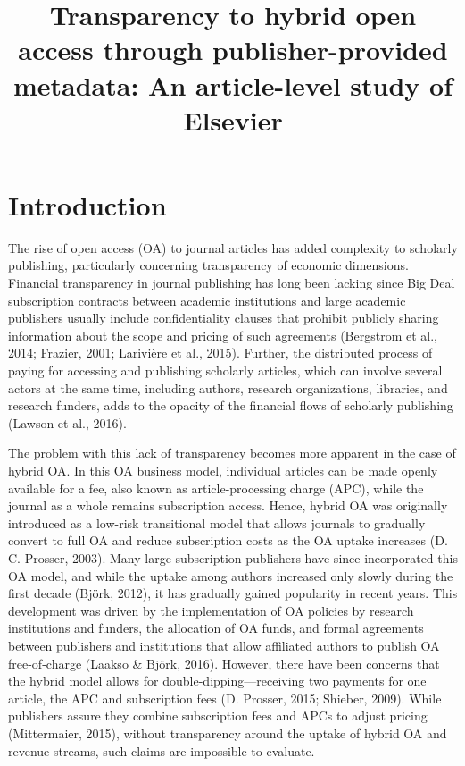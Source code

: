 \documentclass[a4paper,man,floatsintext,longtable,noextraspace,12pt]{apa6}
\title{\textbf{Transparency to hybrid open access  through publisher-provided metadata: An article-level study of Elsevier}}
\begin{document}
\maketitle

\hypertarget{introduction}{%
\section{Introduction}\label{introduction}}

The rise of open access (OA) to journal articles has added complexity to
scholarly publishing, particularly concerning transparency of economic
dimensions. Financial transparency in journal publishing has long been
lacking since Big Deal subscription contracts between academic
institutions and large academic publishers usually include
confidentiality clauses that prohibit publicly sharing information about
the scope and pricing of such agreements (Bergstrom et al., 2014;
Frazier, 2001; Larivière et al., 2015). Further, the distributed process
of paying for accessing and publishing scholarly articles, which can
involve several actors at the same time, including authors, research
organizations, libraries, and research funders, adds to the opacity of
the financial flows of scholarly publishing (Lawson et al., 2016).

The problem with this lack of transparency becomes more apparent in the
case of hybrid OA. In this OA business model, individual articles can be
made openly available for a fee, also known as article-processing charge
(APC), while the journal as a whole remains subscription access. Hence,
hybrid OA was originally introduced as a low-risk transitional model
that allows journals to gradually convert to full OA and reduce
subscription costs as the OA uptake increases (D. C. Prosser, 2003).
Many large subscription publishers have since incorporated this OA
model, and while the uptake among authors increased only slowly during
the first decade (Björk, 2012), it has gradually gained popularity in
recent years. This development was driven by the implementation of OA
policies by research institutions and funders, the allocation of OA
funds, and formal agreements between publishers and institutions that
allow affiliated authors to publish OA free-of-charge (Laakso \& Björk,
2016). However, there have been concerns that the hybrid model allows
for double-dipping---receiving two payments for one article, the APC and
subscription fees (D. Prosser, 2015; Shieber, 2009). While publishers
assure they combine subscription fees and APCs to adjust pricing
(Mittermaier, 2015), without transparency around the uptake of hybrid OA
and revenue streams, such claims are impossible to evaluate.
\end{document}
